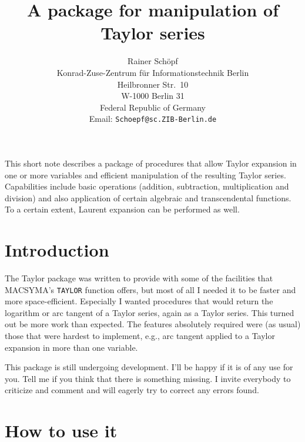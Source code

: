 \newcommand{\MACSYMA}{{\sf MACSYMA}}
\newcommand{\MAPLE}{{\sf MAPLE}}
\newcommand{\Mathematica}{{\sf Mathematica}}
\newcommand{\PSL}{{\sf PSL}}
\title{A \REDUCE{} package for manipulation of Taylor series}
\date{}
\author{Rainer Sch\"opf\\
        Konrad-Zuse-Zentrum f\"ur Informationstechnik Berlin\\
        Heilbronner Str.\ 10\\
        W-1000 Berlin 31\\
        Federal Republic of Germany\\
        Email: {\tt Schoepf@sc.ZIB-Berlin.de}}

\maketitle
{} 

This short note describes a package of \REDUCE{} procedures that allow
Taylor expansion in one or more variables and efficient manipulation
of the resulting Taylor series. Capabilities include basic operations
(addition, subtraction, multiplication and division) and also
application of certain algebraic and transcendental functions. To a
certain extent, Laurent expansion can be performed as well.

\section{Introduction}

The Taylor package was written to provide \REDUCE{} with some of
the facilities
that \MACSYMA's \verb+TAYLOR+ function offers,
but most of all I needed it to be faster and
more space-efficient.
Especially I wanted procedures that would return the logarithm or
arc tangent of a Taylor series, again as a Taylor series.
This turned out be more work than expected. The features absolutely
required were (as usual) those that were hardest to implement,
e.g., arc tangent applied to a Taylor expansion in more than
one variable.

This package is still undergoing development.
I'll be happy if it is of any use for you.
Tell me if you think that there is something missing.
I invite everybody to criticize and comment and will eagerly try to
correct any errors found.

\section{How to use it}

